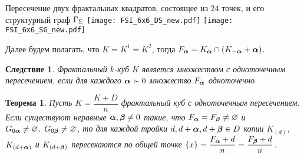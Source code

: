 \documentclass[aspectratio=1610, 10pt, notheorems]{beamer}
\newtheorem{theorem}     {Теорема}
\newtheorem{corollary}   {Следствие}
\begin{document}

\begin{frame}{Пересечение двух фрактальных квадратов, состоящее из $24$ точек, и его структурный граф $\Gamma_\Sigma$}
\texttt{[image: FSI\_6x6\_DS\_new.pdf]}
\hfill
\texttt{[image: FSI\_6x6\_SG\_new.pdf]}
\end{frame}

\begin{frame}{}
Далее будем полагать, что $K=K^1=K^2$, тогда $F_{\bm{\alpha}}=K_{\bm{\alpha}}\cap(K_{-{\bm{\alpha}}}+{\bm{\alpha}})$.
\begin{corollary}
Фрактальный $k$-куб $K$ является множеством с одноточечным пересечением, если для каждого ${\bm{\alpha}}\succ0$ множество $F_{\bm{\alpha}}$ одноточечно.
\end{corollary}
\begin{theorem}
Пусть $K=\dfrac{K+D}{n}$ фрактальный куб с одноточечным пересечением. 
Если существуют неравные ${\bm{\alpha}},{\bm{\beta}}\neq0$ такие, что $F_{\bm{\alpha}}=F_{\bm{\beta}}\neq\varnothing$ и $G_{0{\bm{\alpha}}}\neq\varnothing,\ G_{0{\bm{\beta}}}\neq\varnothing$,  то для каждой тройки $d, d+{\bm{\alpha}}, d+{\bm{\beta}}\in D$ копии $K_{(d)},$ $K_{(d+{\bm{\alpha}})}$ и $K_{(d+{\bm{\beta}})}$ пересекаются по общей точке $\{x\}=\dfrac{F_{\bm{\alpha}}+d}{n}=\dfrac{F_{\bm{\beta}}+d}{n}$.
\end{theorem}
\end{frame}
\end{document}
